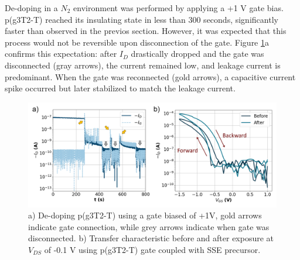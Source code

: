 De-doping in a $N_{2}$ environment was performed by applying a +1 V gate bias. p(g3T2-T) reached its insulating state in less than 300 seconds, significantly faster than observed in the previos section. However, it was expected that this process would not be reversible upon disconnection of the gate. Figure \ref{fig:revox2}a confirms this expectation: after $I_{D}$ drastically dropped and the gate was disconnected (gray arrows), the current remained low, and leakage current is predominant. When the gate was reconnected (gold arrows), a capacitive current spike occurred but later stabilized to match the leakage current.

\begin{figure}[ht]
    \centering
    \includegraphics[width=\textwidth]{Images/pdf/de-doping.pdf}
    \caption[Electrochemical de-doping of oxidized p(g3T2-T) OECT]{a) De-doping p(g3T2-T) using a gate biased of +1V, gold arrows indicate gate connection, while grey arrows indicate when gate was disconnected. b) Transfer characteristic before and after exposure at $V_{DS}$ of -0.1 V using p(g3T2-T) gate coupled with SSE precursor.}
    \label{fig:revox2}
\end{figure}

